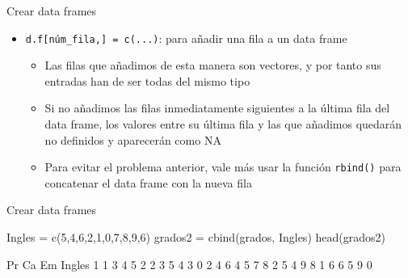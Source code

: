 \documentclass[
  ignorenonframetext,
  aspectratio=169]{beamer}
\newenvironment{Shaded}{\begin{snugshade}}{\end{snugshade}}
\newcommand{\DecValTok}[1]{\textcolor[rgb]{0.00,0.00,0.81}{#1}}
\newcommand{\FunctionTok}[1]{\textcolor[rgb]{0.00,0.00,0.00}{#1}}
\newcommand{\NormalTok}[1]{#1}
\newcommand{\OtherTok}[1]{\textcolor[rgb]{0.56,0.35,0.01}{#1}}
\providecommand{\tightlist}{%
  \setlength{\itemsep}{0pt}\setlength{\parskip}{0pt}}
\let\oldverbatim\verbatim
\let\endoldverbatim\endverbatim
\renewenvironment{verbatim}{\tiny\oldverbatim}{\endoldverbatim}
\begin{document}
\begin{frame}[fragile]{Crear data frames}
\protect\hypertarget{crear-data-frames-3}{}
\begin{itemize}
\tightlist
\item
  \texttt{d.f{[}núm\_fila,{]}\ =\ c(...)}: para añadir una fila a un
  data frame

  \begin{itemize}
  \tightlist
  \item
    Las filas que añadimos de esta manera son vectores, y por tanto sus
    entradas han de ser todas del mismo tipo
  \item
    Si no añadimos las filas inmediatamente siguientes a la última fila
    del data frame, los valores entre su última fila y las que añadimos
    quedarán no definidos y aparecerán como NA
  \item
    Para evitar el problema anterior, vale más usar la función
    \texttt{rbind()} para concatenar el data frame con la nueva fila
  \end{itemize}
\end{itemize}
\end{frame}

\begin{frame}[fragile]{Crear data frames}
\protect\hypertarget{crear-data-frames-4}{}
\begin{Shaded}
\begin{Highlighting}[]
\NormalTok{Ingles }\OtherTok{=} \FunctionTok{c}\NormalTok{(}\DecValTok{5}\NormalTok{,}\DecValTok{4}\NormalTok{,}\DecValTok{6}\NormalTok{,}\DecValTok{2}\NormalTok{,}\DecValTok{1}\NormalTok{,}\DecValTok{0}\NormalTok{,}\DecValTok{7}\NormalTok{,}\DecValTok{8}\NormalTok{,}\DecValTok{9}\NormalTok{,}\DecValTok{6}\NormalTok{)}
\NormalTok{grados2 }\OtherTok{=} \FunctionTok{cbind}\NormalTok{(grados, Ingles)}
\FunctionTok{head}\NormalTok{(grados2)}
\end{Highlighting}
\end{Shaded}

\begin{verbatim}
  Pr Ca Em Ingles
1  1  3  4      5
2  2  3  5      4
3  0  2  4      6
4  5  7  8      2
5  4  9  8      1
6  6  5  9      0
\end{verbatim}
\end{frame}
\end{document}
